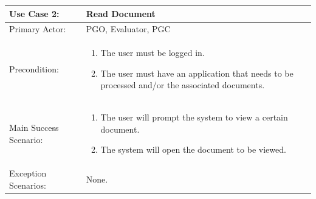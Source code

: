 \documentclass{article}
\begin{document}
\begin{tabular} {| m{5cm} | m{10cm} |}
\hline
Use Case 2: & Read Document \\
\hline
Primary Actor: & PGO, Evaluator, PGC \\
\hline
Precondition: & \begin{enumerate} \itemsep0em \item The user must be logged in. \item The user must have an application that needs to be processed and/or the associated documents. \end{enumerate} \\
\hline
Main Success Scenario: & \begin{enumerate} \itemsep0em \item The user will prompt the system to view a certain document. \item The system will open the document to be viewed. \end{enumerate} \\
\hline
Exception Scenarios: & None. \\
\hline
\end{tabular}
\\ \\ \\ \\
\end{document}
